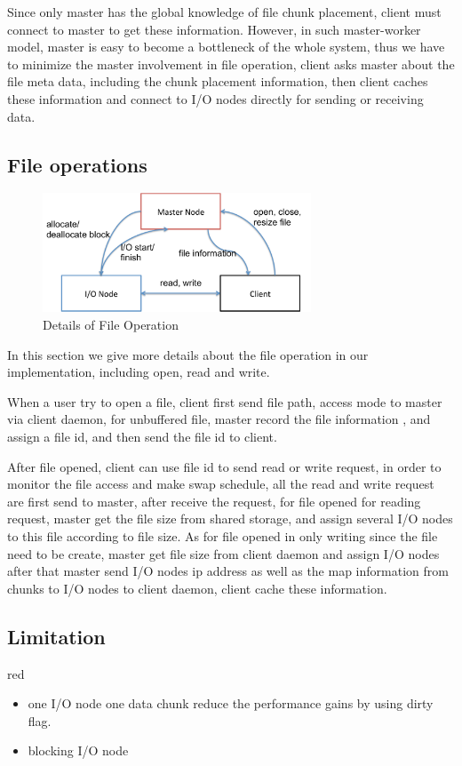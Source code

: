 Since only master has the global knowledge of file chunk placement, client must connect to master to get these information.
However, in such master-worker model, master is easy to become a bottleneck of the whole system,
thus we have to minimize the master involvement in file operation, client asks master about the file meta data, including the chunk placement information,
then client caches these information and connect to I/O nodes directly for sending or receiving data.

\subsection{File operations}

\begin{figure}
\centering
\includegraphics[width=8cm]{img/file_operation}
\caption{Details of File Operation}
\label{implementation:file operation}
\end{figure}

In this section we give more details about the file operation in our implementation, including open, read and write.

When a user try to open a file, client first send file path, access mode to master via client daemon, for unbuffered file, master record the file information , and assign a file id,
and then send the file id to client.

After file opened, client can use file id to send read or write request, in order to monitor the file access and make swap schedule, all the read and write request are first send to master,
after receive the request, for file opened for reading request,
master get the file size from shared storage, and assign several I/O nodes to this file according to file size.
As for file opened in only writing since the file need to be create, master get file size from client daemon and assign I/O nodes
after that master send I/O nodes ip address as well as the map information from chunks to I/O nodes to client daemon, client cache these information.

\subsection{Limitation}
\begin{color}{red}
\begin{itemize}
  \item one I/O node one data chunk reduce the performance gains by using dirty flag.
  \item blocking I/O node
\end{itemize}
\end{color}
